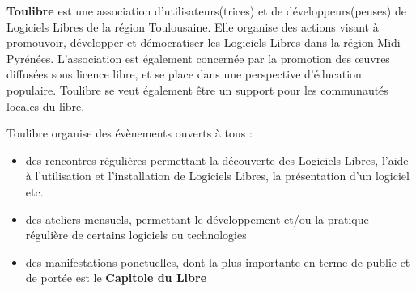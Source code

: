 
\textbf{Toulibre} est une association d'utilisateurs(trices) et de développeurs(peuses) de Logiciels Libres de la région Toulousaine. Elle organise des actions visant à promouvoir, développer et démocratiser les Logiciels Libres dans la région Midi-Pyrénées. L'association est également concernée par la promotion des œuvres diffusées sous licence libre, et se place dans une perspective d'éducation populaire.
Toulibre se veut également être un support pour les communautés locales du libre.

\Separateur

Toulibre organise des évènements ouverts à tous :
\begin{itemize}[label=$\bullet$]
\item des rencontres régulières permettant la découverte des Logiciels Libres, l'aide à l'utilisation et l'installation de Logiciels Libres, la présentation d'un logiciel etc.
\item des ateliers mensuels, permettant le développement et/ou la pratique régulière de certains logiciels ou technologies
\item des manifestations ponctuelles, dont la plus importante en terme de public et de portée est le \textbf{Capitole du Libre}
\end{itemize}
